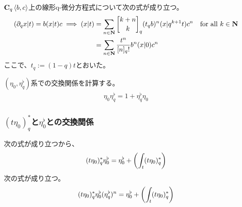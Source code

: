 {	\begin{proposition}\label{prop:線形q-微分方程式の摂動解} %
		$\mathbf{C}_q\mathinner{\langle{b,c}\rangle}$上の線形q-微分方程式について次の式が成り立つ。
		\begin{equation*}\begin{split}
			(\partial_qx|t) = b(x|t)c \implies (x|t) &= \sum_{n\in\sizen}
				\qbinom{k+n}{k}_q(t_qb)^n(x|q^{k+1}t)c^n
				\quad\text{for all } k\in\sizen \\
			&= \sum_{n\in\sizen} \frac{t^n}{[n]_q!} b^n(x|0)c^n
		\end{split}\end{equation*}
		ここで、$t_q:=(1-q)t$とおいた。
	\end{proposition} %

	$(\eta_0,\eta_q^\flat)$系での交換関係を計算する。
	\begin{equation*}\begin{split}
		\eta_0\eta_q^\flat = 1 + \eta_q^\flat\eta_0
	\end{split}\end{equation*}
\subsubsection{$(t\eta_0)_q^*$と$\eta_0^\flat$との交換関係} %
	次の式が成り立つから、
	\begin{equation*}\begin{split}
		(t\eta_0)_q^*\eta_0^\flat = \eta_0^\flat + \mathinner{\left({\int_t(t\eta_0)_q^*}\right)}
	\end{split}\end{equation*}
	次の式が成り立つ。
	\begin{equation*}\begin{split}
		(t\eta_0)_q^*\eta_0^\flat(\eta_q^\flat)^n 
		= \eta_0^\flat + \mathinner{\left({\int_t(t\eta_0)_q^*}\right)}
	\end{split}\end{equation*}
}
